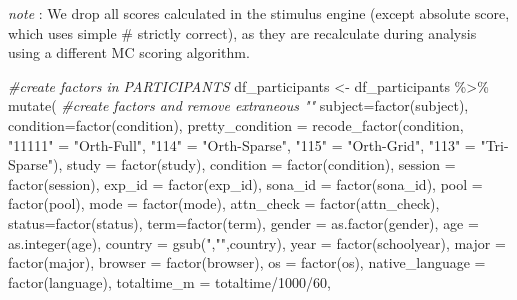 \documentclass[
]{article}
\newenvironment{Shaded}{\begin{snugshade}}{\end{snugshade}}
\newcommand{\AttributeTok}[1]{\textcolor[rgb]{0.77,0.63,0.00}{#1}}
\newcommand{\CommentTok}[1]{\textcolor[rgb]{0.56,0.35,0.01}{\textit{#1}}}
\newcommand{\DecValTok}[1]{\textcolor[rgb]{0.00,0.00,0.81}{#1}}
\newcommand{\FunctionTok}[1]{\textcolor[rgb]{0.00,0.00,0.00}{#1}}
\newcommand{\NormalTok}[1]{#1}
\newcommand{\OtherTok}[1]{\textcolor[rgb]{0.56,0.35,0.01}{#1}}
\newcommand{\SpecialCharTok}[1]{\textcolor[rgb]{0.00,0.00,0.00}{#1}}
\newcommand{\StringTok}[1]{\textcolor[rgb]{0.31,0.60,0.02}{#1}}
\begin{document}
\emph{note} : We drop all scores calculated in the stimulus engine
(except absolute score, which uses simple \# strictly correct), as they
are recalculate during analysis using a different MC scoring algorithm.

\begin{Shaded}
\begin{Highlighting}[]
\CommentTok{\#create factors in PARTICIPANTS}
\NormalTok{df\_participants }\OtherTok{\textless{}{-}}\NormalTok{ df\_participants }\SpecialCharTok{\%\textgreater{}\%}  
  \FunctionTok{mutate}\NormalTok{( }\CommentTok{\#create factors and remove extraneous ""}
    \AttributeTok{subject=}\FunctionTok{factor}\NormalTok{(subject),}
    \AttributeTok{condition=}\FunctionTok{factor}\NormalTok{(condition),}
    \AttributeTok{pretty\_condition =} \FunctionTok{recode\_factor}\NormalTok{(condition, }\StringTok{"11111"} \OtherTok{=} \StringTok{"Orth{-}Full"}\NormalTok{, }\StringTok{"114"} \OtherTok{=}  \StringTok{"Orth{-}Sparse"}\NormalTok{, }\StringTok{"115"} \OtherTok{=} \StringTok{"Orth{-}Grid"}\NormalTok{, }\StringTok{"113"} \OtherTok{=} \StringTok{"Tri{-}Sparse"}\NormalTok{),}
    \AttributeTok{study =} \FunctionTok{factor}\NormalTok{(study),}
    \AttributeTok{condition =} \FunctionTok{factor}\NormalTok{(condition),}
    \AttributeTok{session =} \FunctionTok{factor}\NormalTok{(session),}
    \AttributeTok{exp\_id =} \FunctionTok{factor}\NormalTok{(exp\_id),}
    \AttributeTok{sona\_id =} \FunctionTok{factor}\NormalTok{(sona\_id),}
    \AttributeTok{pool =} \FunctionTok{factor}\NormalTok{(pool),}
    \AttributeTok{mode =} \FunctionTok{factor}\NormalTok{(mode),}
    \AttributeTok{attn\_check =} \FunctionTok{factor}\NormalTok{(attn\_check),}
    \AttributeTok{status=}\FunctionTok{factor}\NormalTok{(status),}
    \AttributeTok{term=}\FunctionTok{factor}\NormalTok{(term),}
    \AttributeTok{gender =} \FunctionTok{as.factor}\NormalTok{(gender),}
    \AttributeTok{age =} \FunctionTok{as.integer}\NormalTok{(age),}
    \AttributeTok{country =} \FunctionTok{gsub}\NormalTok{(}\StringTok{\textquotesingle{}"\textquotesingle{}}\NormalTok{,}\StringTok{""}\NormalTok{,country),}
    \AttributeTok{year =} \FunctionTok{factor}\NormalTok{(schoolyear),}
    \AttributeTok{major =} \FunctionTok{factor}\NormalTok{(major),}
    \AttributeTok{browser =} \FunctionTok{factor}\NormalTok{(browser),}
    \AttributeTok{os =} \FunctionTok{factor}\NormalTok{(os),}
    \AttributeTok{native\_language =} \FunctionTok{factor}\NormalTok{(language),}
    \AttributeTok{totaltime\_m =}\NormalTok{ totaltime}\SpecialCharTok{/}\DecValTok{1000}\SpecialCharTok{/}\DecValTok{60}\NormalTok{,}

\end{Highlighting}
\end{Shaded}
\end{document}
